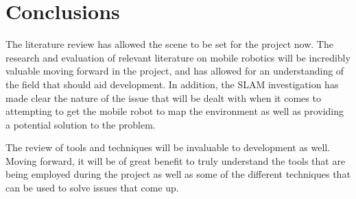 		\chapter{Conclusions}
		The literature review has allowed the scene to be set for the project now. The research and evaluation of relevant literature on mobile robotics will be incredibly valuable moving forward in the project, and has allowed for an understanding of the field that should aid development. In addition, the SLAM investigation has made clear the nature of the issue that will be dealt with when it comes to attempting to get the mobile robot to map the environment as well as providing a potential solution to the problem. 
		
		The review of tools and techniques will be invaluable to development as well. Moving forward, it will be of great benefit to truly understand the tools that are being employed during the project as well as some of the different techniques that can be used to solve issues that come up.
	
	
	
		
				
	